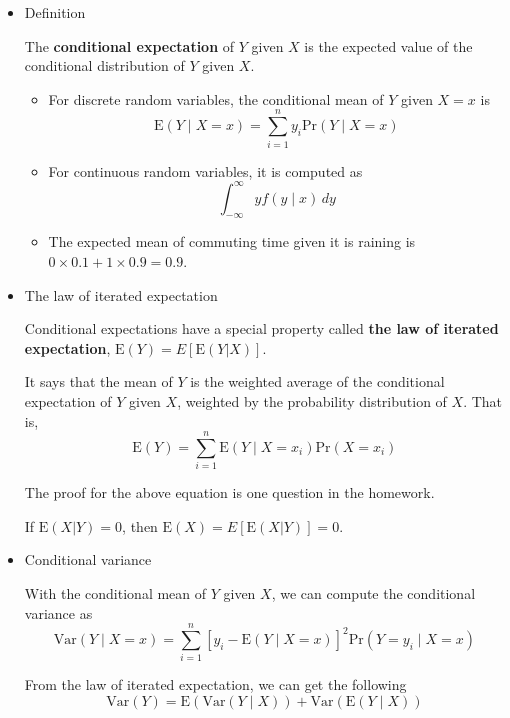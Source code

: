 \documentclass[a4paper,11pt]{article}
\begin{document}
\begin{itemize}
\item Definition
\label{sec:orgb8471bf}

The \textbf{conditional expectation} of \(Y\) given \(X\) is the expected value
of the conditional distribution of \(Y\) given \(X\).

\begin{itemize}
\item For discrete random variables, the conditional mean of \(Y\) given \(X=x\) is
\begin{equation*}
\mathrm{E}(Y \mid X=x) = \sum_{i=1}^n y_i \mathrm{Pr}(Y \mid X=x)
\end{equation*}

\item For continuous random variables, it is computed as
\begin{equation*}
\int_{-\infty}^{\infty} y f(y \mid x)\, dy
\end{equation*}

\item The expected mean of commuting time given it is raining is \(0 \times
  0.1 + 1 \times 0.9 = 0.9\).
\end{itemize}

\item The law of iterated expectation
\label{sec:org61162bc}

Conditional expectations have a special property called \textbf{the law of
iterated expectation}, \(\mathrm{E}(Y) = E \left[ \mathrm{E}(Y|X) \right]\).

It says that the mean of \(Y\) is the weighted average of the
conditional expectation of \(Y\) given \(X\), weighted by the probability
distribution of \(X\). That is,
\[ \mathrm{E}(Y) = \sum_{i=1}^n \mathrm{E}(Y \mid X=x_i) \mathrm{Pr}(X=x_i) \]

The proof for the above equation is one question in the homework.

If \(\mathrm{E}(X|Y) = 0\), then \(\mathrm{E}(X)=E\left[\mathrm{E}(X|Y)\right]=0\).

\item Conditional variance
\label{sec:org238ec69}

With the conditional mean of \(Y\) given \(X\), we can compute the
conditional variance as
\[ \mathrm{Var}(Y \mid X=x) = \sum_{i=1}^n \left[ y_i - \mathrm{E}(Y \mid X=x)
\right]^2 \mathrm{Pr}(Y=y_i \mid X=x) \]

From the law of iterated expectation, we can get the following
\[ \mathrm{Var}(Y) = \mathrm{E}(\mathrm{Var}(Y \mid X)) + \mathrm{Var}(\mathrm{E}(Y \mid
X)) \]
\end{itemize}
\end{document}
